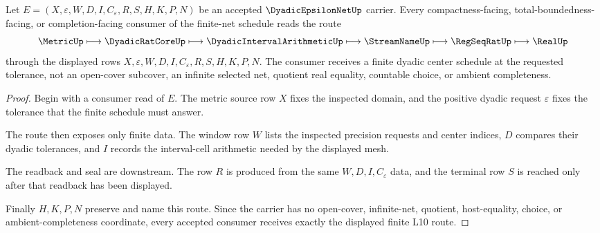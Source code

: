 \begin{theorem}
\label{thm:dyadic-epsilon-net-finite-l10-route}
Let $E=(X,\varepsilon,W,D,I,C_{\varepsilon},R,S,H,K,P,N)$ be an accepted $\DyadicEpsilonNetUp$ carrier. Every compactness-facing, total-boundedness-facing, or completion-facing consumer of the finite-net schedule reads the route
$$
\MetricUp \longmapsto \DyadicRatCoreUp \longmapsto \DyadicIntervalArithmeticUp \longmapsto \StreamNameUp \longmapsto \RegSeqRatUp \longmapsto \RealUp
$$
through the displayed rows $X,\varepsilon,W,D,I,C_{\varepsilon},R,S,H,K,P,N$. The consumer receives a finite dyadic center schedule at the requested tolerance, not an open-cover subcover, an infinite selected net, quotient real equality, countable choice, or ambient completeness.
\end{theorem}
\begin{proof}
Begin with a consumer read of $E$. The metric source row $X$ fixes the inspected domain, and the positive dyadic request $\varepsilon$ fixes the tolerance that the finite schedule must answer.

The route then exposes only finite data. The window row $W$ lists the inspected precision requests and center indices, $D$ compares their dyadic tolerances, and $I$ records the interval-cell arithmetic needed by the displayed mesh.

The readback and seal are downstream. The row $R$ is produced from the same $W,D,I,C_{\varepsilon}$ data, and the terminal row $S$ is reached only after that readback has been displayed.

Finally $H,K,P,N$ preserve and name this route. Since the carrier has no open-cover, infinite-net, quotient, host-equality, choice, or ambient-completeness coordinate, every accepted consumer receives exactly the displayed finite L10 route.
\end{proof}




